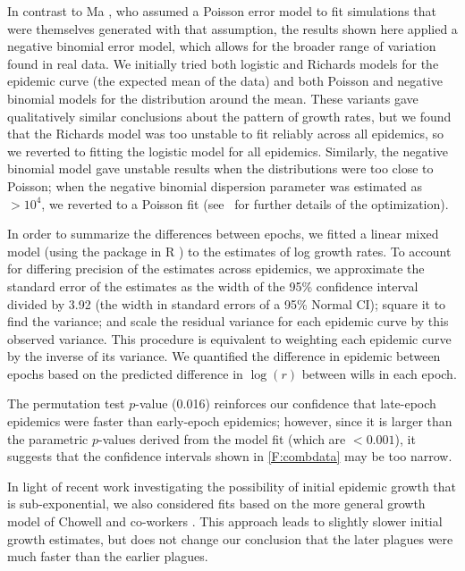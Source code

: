In contrast to Ma \etal \cite{Ma+14}, who assumed a Poisson error model to fit simulations that were themselves generated with that assumption, the results shown here applied a negative binomial error model, which allows for the broader range of variation found in real data.  We initially tried both logistic and Richards \cite{Rich59} models for the epidemic curve (\ie the expected mean of the data) and both Poisson and negative binomial models for the distribution around the mean. These variants gave qualitatively similar conclusions about the pattern of growth rates, but we found that the Richards model was too unstable to fit reliably across all epidemics, so we reverted to fitting the logistic model for all epidemics. Similarly, the negative binomial model gave unstable results when the distributions were too close to Poisson; when the negative binomial dispersion parameter was estimated as $> 10^4$, we reverted to a Poisson fit (see \supp\ for further details of the optimization).

In order to summarize the differences between epochs, we fitted a linear mixed model (using the  package in R \cite{Brook+17}) to the estimates of log growth rates. To account for differing precision of the estimates across epidemics, we approximate the standard error of the estimates as the width of the 95\% confidence interval divided by 3.92 (the width in standard errors of a 95\% Normal CI); square it to find the variance; and scale the residual variance for each epidemic curve by this observed variance. This procedure is equivalent to weighting each epidemic curve by the inverse of its variance. We quantified the difference in epidemic between epochs based on the predicted difference in $\log(r)$ between wills in each epoch.

The permutation test $p$-value (0.016) reinforces our confidence that late-epoch epidemics were faster than early-epoch epidemics; however, since it is larger than the parametric $p$-values derived from the model fit (which are $< 0.001$), it suggests that the confidence intervals shown in \cref{F:combdata} may be too narrow.

In light of recent work investigating the possibility of initial epidemic growth that is sub-exponential, we also considered fits based on the more general growth model of Chowell and co-workers \cite{Vibo+16,Chow+16,ChamEarn16}.  This approach leads to slightly slower initial growth estimates, but does not change our conclusion that the later plagues were much faster than the earlier plagues.

